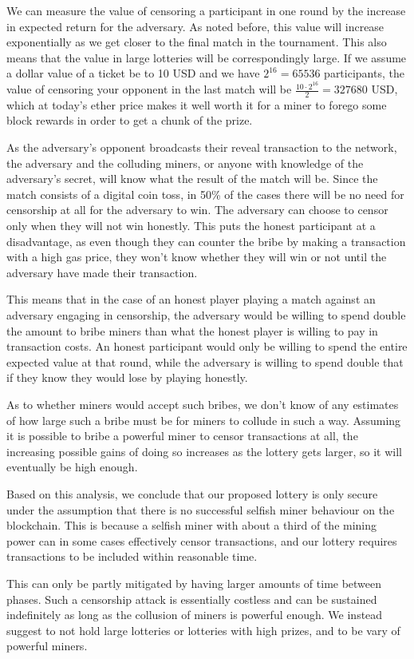 We can measure the value of censoring a participant in one round by the increase in expected return for the adversary. As noted before, this value will increase exponentially as we get closer to the final match in the tournament. This also means that the value in large lotteries will be correspondingly large. If we assume a dollar value of a ticket be to 10 USD and we have $2^{16}=65536$ participants, the value of censoring your opponent in the last match will be $\frac{10 \cdot 2^{16}}{2}=327680$ USD, which at today's ether price makes it well worth it for a miner to forego some block rewards in order to get a chunk of the prize.

As the adversary's opponent broadcasts their reveal transaction to the network, the adversary and the colluding miners, or anyone with knowledge of the adversary's secret, will know what the result of the match will be. Since the match consists of a digital coin toss, in 50\% of the cases there will be no need for censorship at all for the adversary to win. The adversary can choose to censor only when they will not win honestly. This puts the honest participant at a disadvantage, as even though they can counter the bribe by making a transaction with a high gas price, they won't know whether they will win or not until the adversary have made their transaction.

This means that in the case of an honest player playing a match against an adversary engaging in censorship, the adversary would be willing to spend double the amount to bribe miners than what the honest player is willing to pay in transaction costs. An honest participant would only be willing to spend the entire expected value at that round, while the adversary is willing to spend double that if they know they would lose by playing honestly.

As to whether miners would accept such bribes, we don't know of any estimates of how large such a bribe must be for miners to collude in such a way. Assuming it is possible to bribe a powerful miner to censor transactions at all, the increasing possible gains of doing so increases as the lottery gets larger, so it will eventually be high enough.

Based on this analysis, we conclude that our proposed lottery is only secure under the assumption that there is no successful selfish miner behaviour on the blockchain. This is because a selfish miner with about a third of the mining power can in some cases effectively censor transactions, and our lottery requires transactions to be included within reasonable time. 

This can only be partly mitigated by having larger amounts of time between phases. Such a censorship attack is essentially costless and can be sustained indefinitely as long as the collusion of miners is powerful enough. We instead suggest to not hold large lotteries or lotteries with high prizes, and to be vary of powerful miners.
